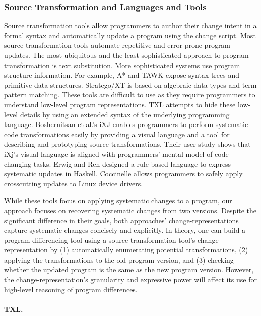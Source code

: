 \documentclass[runningheads,a4paper]{llncs}
\begin{document}
\subsubsection{Source Transformation and Languages and Tools} 

Source transformation tools allow programmers to author their change intent in a formal syntax and automatically update a program using the change script. Most source transformation tools automate repetitive and error-prone program updates. The most ubiquitous and the least sophisticated approach to program transformation is text substitution. More sophisticated systems use program structure information. For example, A* \cite{Ladd1995} and TAWK \cite{Griswold1996} expose syntax trees and primitive data structures. Stratego/XT\cite{Visser2004} is based on algebraic data types and term pattern matching. These tools are difficult to use as they require programmers to understand low-level program representations. TXL \cite{Cordy2006} attempts to hide these low-level details by using an extended syntax of the underlying programming language. Boshernitsan et al.'s iXJ \cite{Boshernitsan2007} enables programmers to perform systematic code transformations easily by providing a visual language and a tool for describing and prototyping source transformations. Their user study shows that iXj's visual language is aligned with programmers' mental model of code changing tasks. Erwig and Ren \cite{Erwig2002} designed a rule-based language to express systematic updates in Haskell. Coccinelle \cite{Padioleau2008} allows programmers to safely apply crosscutting updates to Linux device drivers. 

While these tools focus on applying systematic changes to a program, our approach focuses on recovering systematic changes from two versions. 
Despite the significant difference in their goals, both approaches' change-representations capture systematic changes concisely and explicitly. In theory, one can build a program differencing tool using a source transformation tool's change-representation by (1) automatically enumerating potential transformations, (2) applying the transformations to the old program version, and (3) checking whether the updated program is the same as the new program version. 
However, the change-representation's granularity and expressive power will affect its use for high-level reasoning of program differences. 

\paragraph{\textbf{TXL.}} 
\end{document}
